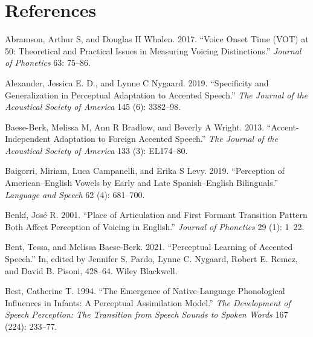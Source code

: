 \documentclass[
  preprint]{elsarticle}
\newlength{\cslhangindent}
\newlength{\cslentryspacingunit} %
\newenvironment{CSLReferences}[2] %
 {%
  \setlength{\parindent}{0pt}
  \ifodd #1
  \let\oldpar\par
  \def\par{\hangindent=\cslhangindent\oldpar}
  \fi
  \setlength{\parskip}{#2\cslentryspacingunit}
 }%
 {}
\begin{document}
\newpage

\section*{References}

\setlength{\parindent}{-0.2in}
\setlength{\leftskip}{0.2in}

\noindent

\hypertarget{refs}{}
\begin{CSLReferences}{1}{0}
\leavevmode{}%
Abramson, Arthur S, and Douglas H Whalen. 2017. {``Voice Onset Time ({VOT}) at 50: Theoretical and Practical Issues in Measuring Voicing Distinctions.''} \emph{Journal of Phonetics} 63: 75--86.

\leavevmode{}%
Alexander, Jessica E. D., and Lynne C Nygaard. 2019. {``Specificity and Generalization in Perceptual Adaptation to Accented Speech.''} \emph{The Journal of the Acoustical Society of America} 145 (6): 3382--98.

\leavevmode{}%
Baese-Berk, Melissa M, Ann R Bradlow, and Beverly A Wright. 2013. {``Accent-Independent Adaptation to Foreign Accented Speech.''} \emph{The Journal of the Acoustical Society of America} 133 (3): EL174--80.

\leavevmode{}%
Baigorri, Miriam, Luca Campanelli, and Erika S Levy. 2019. {``Perception of {American}--{English} Vowels by Early and Late {Spanish}--{English} Bilinguals.''} \emph{Language and Speech} 62 (4): 681--700.

\leavevmode{}%
Benkí, José R. 2001. {``Place of Articulation and First Formant Transition Pattern Both Affect Perception of Voicing in {English}.''} \emph{Journal of Phonetics} 29 (1): 1--22.

\leavevmode{}%
Bent, Tessa, and Melissa Baese-Berk. 2021. {``Perceptual Learning of Accented Speech.''} In, edited by Jennifer S. Pardo, Lynne C. Nygaard, Robert E. Remez, and David B. Pisoni, 428--64. Wiley Blackwell.

\leavevmode{}%
Best, Catherine T. 1994. {``The Emergence of Native-Language Phonological Influences in Infants: A Perceptual Assimilation Model.''} \emph{The Development of Speech Perception: The Transition from Speech Sounds to Spoken Words} 167 (224): 233--77.


\end{CSLReferences}
\end{document}

